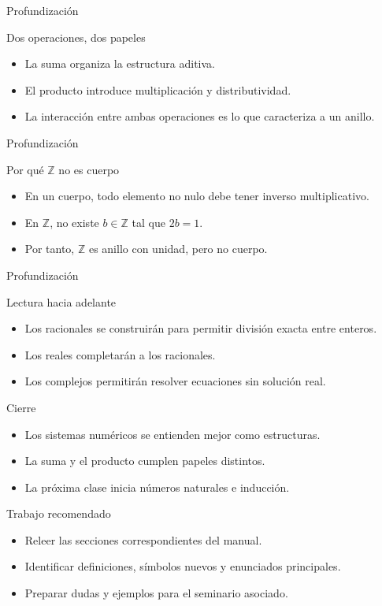 \documentclass[aspectratio=169,11pt]{beamer}
\begin{document}
\begin{frame}{Profundización}
\begin{block}{Dos operaciones, dos papeles}
\begin{itemize}
  \item La suma organiza la estructura aditiva.
  \item El producto introduce multiplicación y distributividad.
  \item La interacción entre ambas operaciones es lo que caracteriza a un anillo.
\end{itemize}
\end{block}
\end{frame}

\begin{frame}{Profundización}
\begin{block}{Por qué \(\mathbb{Z}\) no es cuerpo}
\begin{itemize}
  \item En un cuerpo, todo elemento no nulo debe tener inverso multiplicativo.
  \item En \(\mathbb{Z}\), no existe \(b\in\mathbb{Z}\) tal que \(2b=1\).
  \item Por tanto, \(\mathbb{Z}\) es anillo con unidad, pero no cuerpo.
\end{itemize}
\end{block}
\end{frame}

\begin{frame}{Profundización}
\begin{block}{Lectura hacia adelante}
\begin{itemize}
  \item Los racionales se construirán para permitir división exacta entre enteros.
  \item Los reales completarán a los racionales.
  \item Los complejos permitirán resolver ecuaciones sin solución real.
\end{itemize}
\end{block}
\end{frame}

\begin{frame}{Cierre}
\begin{itemize}
  \item Los sistemas numéricos se entienden mejor como estructuras.
  \item La suma y el producto cumplen papeles distintos.
  \item La próxima clase inicia números naturales e inducción.
\end{itemize}
\end{frame}

\begin{frame}{Trabajo recomendado}
\begin{itemize}
  \item Releer las secciones correspondientes del manual.
  \item Identificar definiciones, símbolos nuevos y enunciados principales.
  \item Preparar dudas y ejemplos para el seminario asociado.
\end{itemize}
\end{frame}
\end{document}
